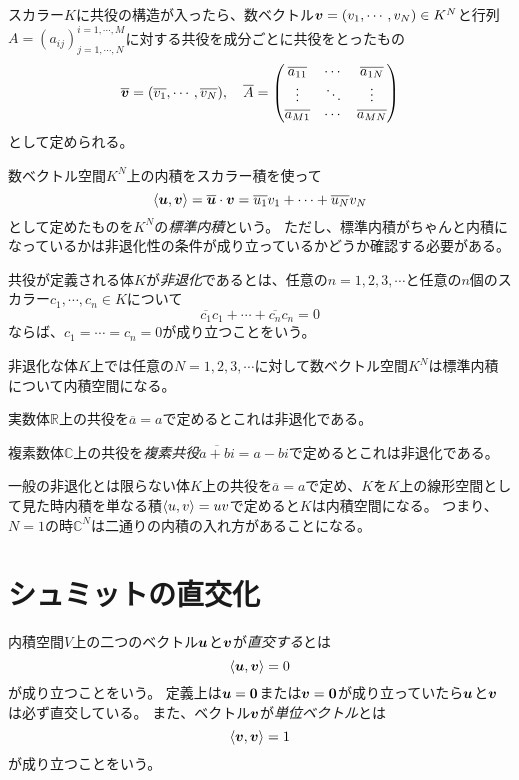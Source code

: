 スカラー$K$に共役の構造が入ったら、数ベクトル$\vb*{v} = (v_1, \cdots, v_N) \in K^N$と行列$A = (a_{i j})^{i = 1, \cdots, M}_{j = 1, \cdots, N}$に対する共役を成分ごとに共役をとったもの
$$
\overline{\vb*{v}} = (\overline{v_1}, \cdots, \overline{v_N}),
\quad
\overline{A} = \mqty(\overline{a_{1 1}} & \cdots & \overline{a_{1 N}} \\ \vdots & \ddots & \vdots \\ \overline{a_{M 1}} & \cdots & \overline{a_{M N}})
$$
として定められる。

数ベクトル空間$K^N$上の内積をスカラー積を使って
$$
\langle\vb*{u}, \vb*{v}\rangle
= \overline{\vb*{u}}\cdot\vb*{v}
= \overline{u_1} v_1+\cdots+\overline{u_N} v_N
$$
として定めたものを$K^N$の\emph{標準内積}という。
ただし、標準内積がちゃんと内積になっているかは非退化性の条件が成り立っているかどうか確認する必要がある。

\begin{definition}[非退化な体]
共役が定義される体$K$が\emph{非退化}であるとは、任意の$n = 1, 2, 3, \cdots$と任意の$n$個のスカラー$c_1, \cdots, c_n \in K$について
$$
\overline{c_1}c_1+\cdots+\overline{c_n}c_n = 0
$$
ならば、$c_1 = \cdots = c_n = 0$が成り立つことをいう。
\end{definition}

非退化な体$K$上では任意の$N = 1, 2, 3, \cdots$に対して数ベクトル空間$K^N$は標準内積について内積空間になる。

\begin{example}
実数体$\mathbb{R}$上の共役を$\overline{a} = a$で定めるとこれは非退化である。
\end{example}

\begin{example}
複素数体$\mathbb{C}$上の共役を\emph{複素共役}$\overline{a+b i} = a-b i$で定めるとこれは非退化である。
\end{example}

\begin{example}
一般の非退化とは限らない体$K$上の共役を$\overline{a} = a$で定め、$K$を$K$上の線形空間として見た時内積を単なる積$\langle u, v\rangle = u v$で定めると$K$は内積空間になる。
つまり、$N = 1$の時$\mathbb{C}^N$は二通りの内積の入れ方があることになる。
\end{example}

\section{シュミットの直交化}

内積空間$V$上の二つのベクトル$\vb*{u}$と$\vb*{v}$が\emph{直交する}とは
$$
\langle\vb*{u}, \vb*{v}\rangle = 0
$$
が成り立つことをいう。
定義上は$\vb*{u} = \vb*{0}$または$\vb*{v} = \vb*{0}$が成り立っていたら$\vb*{u}$と$\vb*{v}$は必ず直交している。
また、ベクトル$\vb*{v}$が\emph{単位ベクトル}とは
$$
\langle\vb*{v}, \vb*{v}\rangle = 1
$$
が成り立つことをいう。

